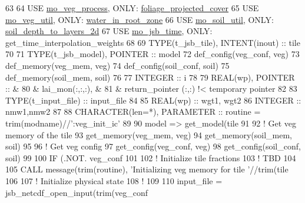 \begin{DoxyCode}
63 
64     \textcolor{keywordtype}{USE }\hyperlink{namespacemo__veg__process}{mo\_veg\_process}\textcolor{keywordtype}{, ONLY}: \hyperlink{namespacemo__veg__process_a274a1f4ec71f0e64f08d19c388367d89}{foliage\_projected\_cover}
65     \textcolor{keywordtype}{USE }\hyperlink{namespacemo__veg__util}{mo\_veg\_util}\textcolor{keywordtype}{,    ONLY}: \hyperlink{namespacemo__veg__util_af6216ea4cafe0107cd77fd3774c1b948}{water\_in\_root\_zone}
66     \textcolor{keywordtype}{USE }\hyperlink{namespacemo__soil__util}{mo\_soil\_util}\textcolor{keywordtype}{,   ONLY}: \hyperlink{namespacemo__soil__util_ad78dd96d8e36c528df761c9769302d5f}{soil\_depth\_to\_layers\_2d}
67     \textcolor{keywordtype}{USE }\hyperlink{namespacemo__jsb__time}{mo\_jsb\_time}\textcolor{keywordtype}{,    ONLY}: get\_time\_interpolation\_weights
68 
69     \textcolor{keywordtype}{TYPE}(t\_jsb\_tile),  \textcolor{keywordtype}{INTENT(inout)} :: tile
70 
71     \textcolor{keywordtype}{TYPE}(t\_jsb\_model),        \textcolor{keywordtype}{POINTER} :: model
72     def\_config(veg\_conf, veg)
73     def\_memory(veg\_mem, veg)
74     def\_config(soil\_conf, soil)
75     def\_memory(soil\_mem, soil)
76 
77     \textcolor{keywordtype}{INTEGER} :: i
78 
79     \textcolor{keywordtype}{REAL(wp)}, \textcolor{keywordtype}{POINTER} ::        &
80       & lai\_mon(:,:,:),         &
81       & return\_pointer (:,:)       !< temporary pointer
82 
83     \textcolor{keywordtype}{TYPE}(t\_input\_file) :: input\_file
84 
85     \textcolor{keywordtype}{REAL(wp)} :: wgt1, wgt2
86     \textcolor{keywordtype}{INTEGER}  :: nmw1,nmw2
87 
88     \textcolor{keywordtype}{CHARACTER(len=*)}, \textcolor{keywordtype}{PARAMETER} :: routine = trim(modname)//\textcolor{stringliteral}{':veg\_init\_ic'}
89 
90     model => get\_model(tile%
91 
92     \textcolor{comment}{! Get veg memory of the tile}
93     get\_memory(veg\_mem, veg)
94     get\_memory(soil\_mem, soil)
95 
96     \textcolor{comment}{! Get veg config}
97     get\_config(veg\_conf, veg)
98     get\_config(soil\_conf, soil)
99 
100     \textcolor{keywordflow}{IF} (.NOT. veg\_conf%
101 
102     \textcolor{comment}{! Initialize tile fractions}
103     \textcolor{comment}{! TBD}
104 
105     \textcolor{keyword}{CALL }message(trim(routine), \textcolor{stringliteral}{'Initializing veg memory for tile '}//trim(tile%
106 
107     \textcolor{comment}{! Initialize physical state}
108     \textcolor{comment}{!}
109 
110     input\_file = jsb\_netcdf\_open\_input(trim(veg\_conf%

\end{DoxyCode}
